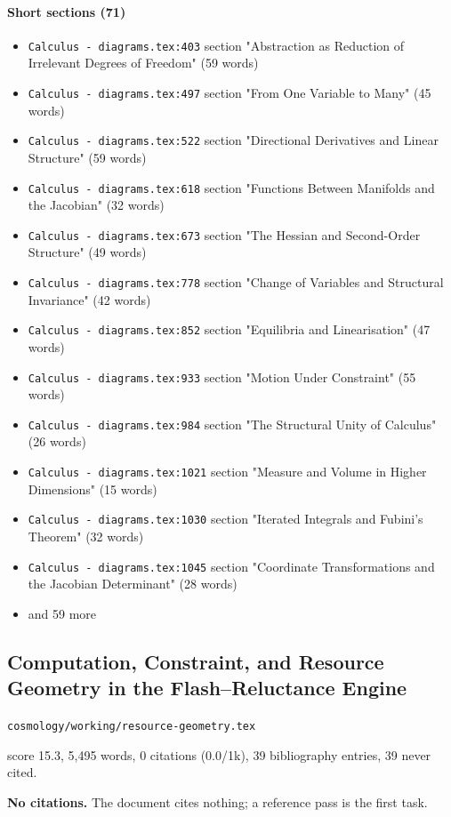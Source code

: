 \documentclass[11pt]{article}
\newcommand{\loc}[1]{{\small\color{muted}\texttt{#1}}}
\begin{document}
\paragraph{Short sections (71)}
\begin{itemize}
\item \loc{Calculus - diagrams.tex:403} section "Abstraction as Reduction of Irrelevant Degrees of Freedom" (59 words)
\item \loc{Calculus - diagrams.tex:497} section "From One Variable to Many" (45 words)
\item \loc{Calculus - diagrams.tex:522} section "Directional Derivatives and Linear Structure" (59 words)
\item \loc{Calculus - diagrams.tex:618} section "Functions Between Manifolds and the Jacobian" (32 words)
\item \loc{Calculus - diagrams.tex:673} section "The Hessian and Second-Order Structure" (49 words)
\item \loc{Calculus - diagrams.tex:778} section "Change of Variables and Structural Invariance" (42 words)
\item \loc{Calculus - diagrams.tex:852} section "Equilibria and Linearisation" (47 words)
\item \loc{Calculus - diagrams.tex:933} section "Motion Under Constraint" (55 words)
\item \loc{Calculus - diagrams.tex:984} section "The Structural Unity of Calculus" (26 words)
\item \loc{Calculus - diagrams.tex:1021} section "Measure and Volume in Higher Dimensions" (15 words)
\item \loc{Calculus - diagrams.tex:1030} section "Iterated Integrals and Fubini's Theorem" (32 words)
\item \loc{Calculus - diagrams.tex:1045} section "Coordinate Transformations and the Jacobian Determinant" (28 words)
\item[] {\color{muted}\small and 59 more}
\end{itemize}
\subsection{Computation, Constraint, and Resource Geometry in the Flash--Reluctance Engine}
\loc{cosmology/\allowbreak{}working/\allowbreak{}resource-geometry.tex}\par
score 15.3, 5,495 words, 0 citations (0.0/1k), 39 bibliography entries, 39 never cited.

\textbf{No citations.} The document cites nothing; a reference pass is the first task.
\end{document}
